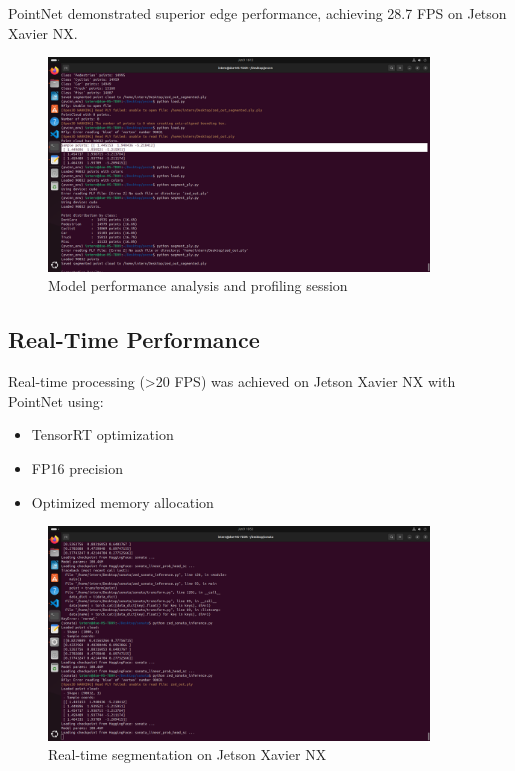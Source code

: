 \documentclass[12pt,a4paper]{report}
\begin{document}
PointNet demonstrated superior edge performance, achieving 28.7 FPS on Jetson Xavier NX.

\begin{figure}[htbp]
    \centering
    \includegraphics[width=0.9\textwidth]{figures/model_analysis.png}
    \caption{Model performance analysis and profiling session}
    \label{fig:model_analysis}
\end{figure}

\subsection{Real-Time Performance}

Real-time processing (>20 FPS) was achieved on Jetson Xavier NX with PointNet using:
\begin{itemize}
    \item TensorRT optimization
    \item FP16 precision
    \item Optimized memory allocation
\end{itemize}

\begin{figure}[htbp]
    \centering
    \includegraphics[width=0.9\textwidth]{figures/real_time_inference.png}
    \caption{Real-time segmentation on Jetson Xavier NX}
    \label{fig:real_time_inference}
\end{figure}
\end{document}

